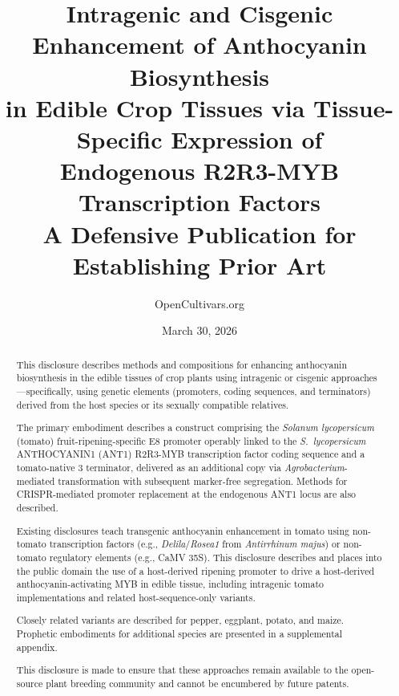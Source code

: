 \documentclass[12pt,a4paper]{article}
\title{%
  \textbf{Intragenic and Cisgenic Enhancement of Anthocyanin Biosynthesis\\
  in Edible Crop Tissues via Tissue-Specific Expression of\\
  Endogenous R2R3-MYB Transcription Factors}\\[1em]
  \large A Defensive Publication for Establishing Prior Art
}
\author{OpenCultivars.org}
\date{March 30, 2026}
\begin{document}
\maketitle
\thispagestyle{fancy}

\begin{center}
\end{center}

\vspace{1em}

\begin{abstract}
This disclosure describes methods and compositions for enhancing anthocyanin biosynthesis in the edible tissues of crop plants using intragenic or cisgenic approaches---specifically, using genetic elements (promoters, coding sequences, and terminators) derived from the host species or its sexually compatible relatives.

The primary embodiment describes a construct comprising the \textit{Solanum lycopersicum} (tomato) fruit-ripening-specific E8 promoter operably linked to the \textit{S.~lycopersicum} ANTHOCYANIN1 (ANT1) R2R3-MYB transcription factor coding sequence and a tomato-native 3\textquotesingle{} terminator, delivered as an additional copy via \textit{Agrobacterium}-mediated transformation with subsequent marker-free segregation. Methods for CRISPR-mediated promoter replacement at the endogenous ANT1 locus are also described.

Existing disclosures teach transgenic anthocyanin enhancement in tomato using non-tomato transcription factors (e.g., \textit{Delila}/\textit{Rosea1} from \textit{Antirrhinum majus}) or non-tomato regulatory elements (e.g., CaMV 35S). This disclosure describes and places into the public domain the use of a host-derived ripening promoter to drive a host-derived anthocyanin-activating MYB in edible tissue, including intragenic tomato implementations and related host-sequence-only variants.

Closely related variants are described for pepper, eggplant, potato, and maize. Prophetic embodiments for additional species are presented in a supplemental appendix.

This disclosure is made to ensure that these approaches remain available to the open-source plant breeding community and cannot be encumbered by future patents.
\end{abstract}
\end{document}

